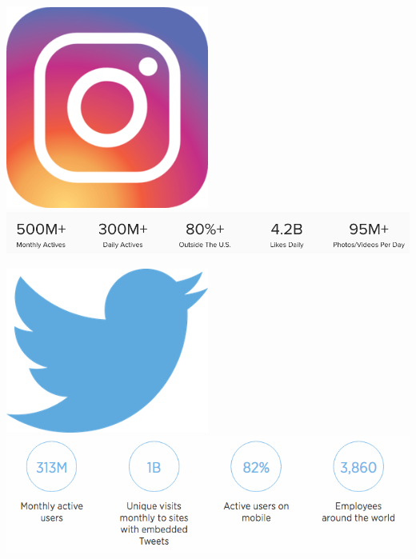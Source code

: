 \documentclass{beamer}
\begin{document}
\begin{frame}[plain]
  \begin{center}
      \includegraphics[width=0.5\textwidth]{img/instagram-logo.png} \\
      \includegraphics[width=\textwidth]{img/instagram-stats.png} \\
  \end{center}
\end{frame}

\begin{frame}[plain]
  \begin{center}
      \includegraphics[width=0.5\textwidth]{img/twitter-logo.png} \\
      \includegraphics[width=\textwidth]{img/twitter-stats.png} \\
  \end{center}
\end{frame}
\end{document}
